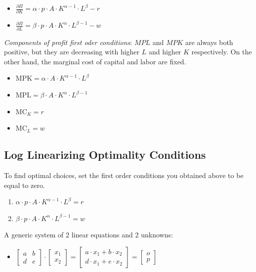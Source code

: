 \documentclass[
]{book}
\providecommand{\tightlist}{%
  \setlength{\itemsep}{0pt}\setlength{\parskip}{0pt}}
\begin{document}
\begin{itemize}
\item
  \(\displaystyle \frac{\partial \Pi }{\partial K}=\alpha \cdot p\cdot A\cdot K^{\alpha -1} \cdot L^{\beta } -r\)
\item
  \(\displaystyle \frac{\partial \Pi }{\partial L}=\beta \cdot p\cdot A\cdot K^{\alpha } \cdot L^{\beta -1} -w\)
\end{itemize}

\emph{Components of profit first oder conditions}: \(MPL\) and \(MPK\) are always
both positive, but they are decreasing with higher \(L\) and higher \(K\)
respectively. On the other hand, the marginal cost of capital and labor
are fixed.

\begin{itemize}
\item
  \(\displaystyle \textrm{MPK}=\alpha \cdot A\cdot K^{\alpha -1} \cdot L^{\beta }\)
\item
  \(\displaystyle \textrm{MPL}=\beta \cdot A\cdot K^{\alpha } \cdot L^{\beta -1}\)
\item
  \(\displaystyle {\textrm{MC}}_K =r\)
\item
  \(\displaystyle {\textrm{MC}}_L =w\)
\end{itemize}

\hypertarget{log-linearizing-optimality-conditions}{%
\subsection{Log Linearizing Optimality Conditions}\label{log-linearizing-optimality-conditions}}

To find optimal choices, set the first order conditions you obtained
above to be equal to zero.

\begin{enumerate}
\def\labelenumi{\arabic{enumi}.}
\item
  \(\displaystyle \alpha \cdot p\cdot A\cdot K^{\alpha -1} \cdot L^{\beta } =r\)
\item
  \(\displaystyle \beta \cdot p\cdot A\cdot K^{\alpha } \cdot L^{\beta -1} =w\)
\end{enumerate}

A generic system of 2 linear equations and 2 unknowns:

\begin{itemize}
\tightlist
\item
  \(\displaystyle \left\lbrack \begin{array}{cc} a & b\\ d & e \end{array}\right\rbrack \cdot \left\lbrack \begin{array}{c} x_1 \\ x_2 \end{array}\right\rbrack =\left\lbrack \begin{array}{cc} a\cdot x_1 +b\cdot x_2 \\ d\cdot x_1 +e\cdot x_2 \end{array}\right\rbrack =\left\lbrack \begin{array}{c} o\\ p \end{array}\right\rbrack\)
\end{itemize}
\end{document}
